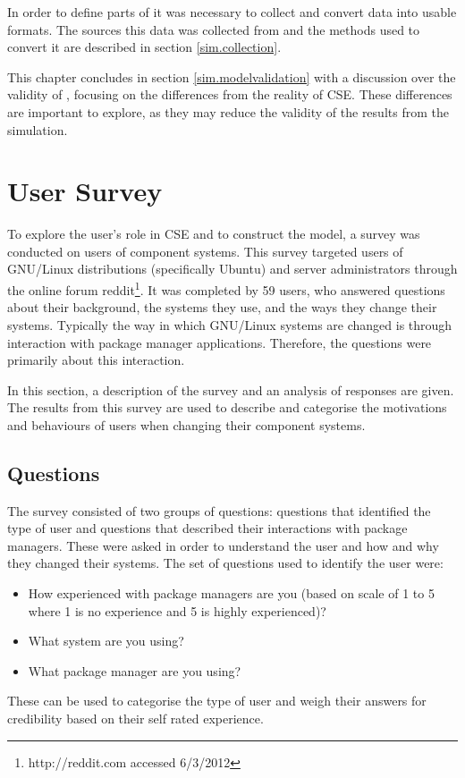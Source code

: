 In order to define parts of \usermodel it was necessary to collect and convert data into usable formats.
The sources this data was collected from and the methods used to convert it are described in section \ref{sim.collection}.

This chapter concludes in section \ref{sim.modelvalidation} with a discussion over the validity of \usermodel, focusing on the differences from the reality of CSE.
These differences are important to explore, as they may reduce the validity of the results from the simulation.

\section{User Survey}
\label{strat.usersurvey}
To explore the user's role in CSE and to construct the \usermodel model, a survey was conducted on users of component systems.
This survey targeted users of GNU/Linux distributions (specifically Ubuntu) and server administrators through the online forum reddit\footnote{http://reddit.com accessed 6/3/2012}.
It was completed by 59 users, who answered questions about their background, the systems they use, and the ways they change their systems.
Typically the way in which GNU/Linux systems are changed is through interaction with package manager applications. 
Therefore, the questions were primarily about this interaction.

In this section, a description of the survey and an analysis of responses are given.
The results from this survey are used to describe and categorise the motivations and behaviours of users when changing their component systems.

\subsection{Questions}
The survey consisted of two groups of questions: questions that identified the type of user and questions that described their interactions with package managers.
These were asked in order to understand the user and how and why they changed their systems.
The set of questions used to identify the user were:
\begin{itemize}
  \item How experienced with package managers are you (based on scale of 1 to 5 where 1 is no experience and 5 is highly experienced)? 
  \item What system are you using?
  \item What package manager are you using?
\end{itemize}
These can be used to categorise the type of user and weigh their answers for credibility based on their self rated experience.

